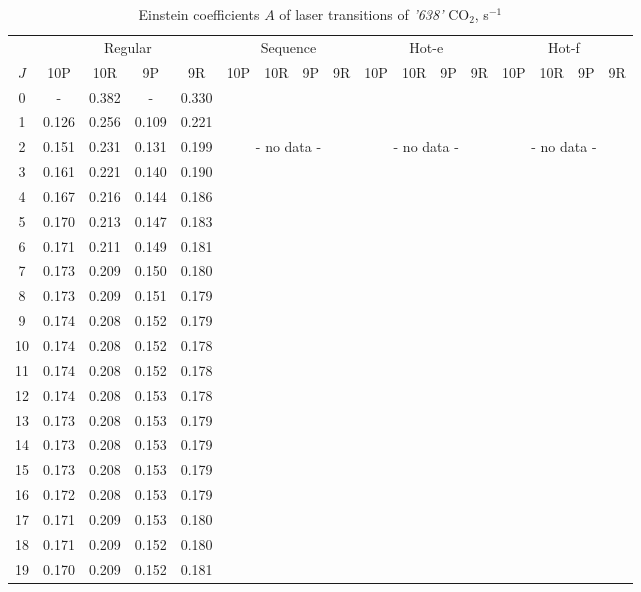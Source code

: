 \documentclass{report}
\begin{document}
\begin{appendices}
\begin{table}
\centering
\caption{Einstein coefficients $A$ of laser transitions of \textit{'638'} {CO$_2$}, s$^{-1}$}
\label{table:A638}
\scriptsize
\begin{tabular}{|c|cccc|cccc|cccc|cccc|}
\hline
& \multicolumn{4}{c|}{Regular}& \multicolumn{4}{c|}{Sequence}& \multicolumn{4}{c|}{Hot-e}& \multicolumn{4}{c|}{Hot-f}\\
$J$ & 10P & 10R & 9P & 9R & 10P & 10R & 9P & 9R & 10P & 10R & 9P & 9R & 10P & 10R & 9P & 9R\\ 
\hline
0  &   -   & 0.382 &   -   & 0.330 & & & & & & & & & & & &\\
1  & 0.126 & 0.256 & 0.109 & 0.221 & & & & & & & & & & & &\\
2  & 0.151 & 0.231 & 0.131 & 0.199 & \multicolumn{4}{c|}{- no data -}& \multicolumn{4}{c|}{- no data -}& \multicolumn{4}{c|}{- no data -}\\
3  & 0.161 & 0.221 & 0.140 & 0.190 & & & & & & & & & & & &\\
4  & 0.167 & 0.216 & 0.144 & 0.186 & & & & & & & & & & & &\\
5  & 0.170 & 0.213 & 0.147 & 0.183 & & & & & & & & & & & &\\
6  & 0.171 & 0.211 & 0.149 & 0.181 & & & & & & & & & & & &\\
7  & 0.173 & 0.209 & 0.150 & 0.180 & & & & & & & & & & & &\\
8  & 0.173 & 0.209 & 0.151 & 0.179 & & & & & & & & & & & &\\
9  & 0.174 & 0.208 & 0.152 & 0.179 & & & & & & & & & & & &\\
10 & 0.174 & 0.208 & 0.152 & 0.178 & & & & & & & & & & & &\\
11 & 0.174 & 0.208 & 0.152 & 0.178 & & & & & & & & & & & &\\
12 & 0.174 & 0.208 & 0.153 & 0.178 & & & & & & & & & & & &\\
13 & 0.173 & 0.208 & 0.153 & 0.179 & & & & & & & & & & & &\\
14 & 0.173 & 0.208 & 0.153 & 0.179 & & & & & & & & & & & &\\
15 & 0.173 & 0.208 & 0.153 & 0.179 & & & & & & & & & & & &\\
16 & 0.172 & 0.208 & 0.153 & 0.179 & & & & & & & & & & & &\\
17 & 0.171 & 0.209 & 0.153 & 0.180 & & & & & & & & & & & &\\
18 & 0.171 & 0.209 & 0.152 & 0.180 & & & & & & & & & & & &\\
19 & 0.170 & 0.209 & 0.152 & 0.181 & & & & & & & & & & & &\\

\end{tabular}
\end{table}
\end{appendices}
\end{document}

